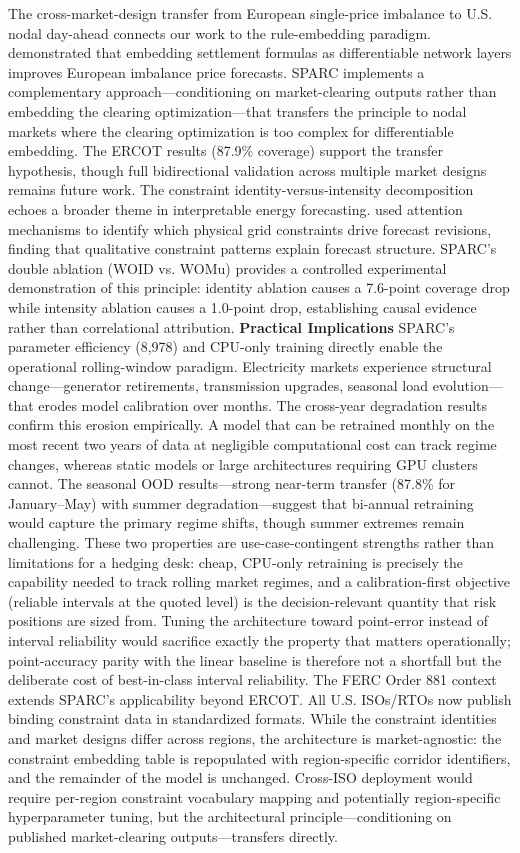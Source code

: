 \documentclass[twoside]{article}
\begin{document}
The cross-market-design transfer from European single-price imbalance to U.S. nodal day-ahead connects our work to the rule-embedding paradigm. \cite{yu2026marketruleinformed} demonstrated that embedding settlement formulas as differentiable network layers improves European imbalance price forecasts. SPARC implements a complementary approach---conditioning on market-clearing outputs rather than embedding the clearing optimization---that transfers the principle to nodal markets where the clearing optimization is too complex for differentiable embedding. The ERCOT results (87.9\% coverage) support the transfer hypothesis, though full bidirectional validation across multiple market designs remains future work.
The constraint identity-versus-intensity decomposition echoes a broader theme in interpretable energy forecasting. \cite{toubeau2021interpretable} used attention mechanisms to identify which physical grid constraints drive forecast revisions, finding that qualitative constraint patterns explain forecast structure. SPARC's double ablation (WOID vs. WOMu) provides a controlled experimental demonstration of this principle: identity ablation causes a 7.6-point coverage drop while intensity ablation causes a 1.0-point drop, establishing causal evidence rather than correlational attribution.
\textbf{Practical Implications}
SPARC's parameter efficiency (8,978) and CPU-only training directly enable the operational rolling-window paradigm. Electricity markets experience structural change---generator retirements, transmission upgrades, seasonal load evolution---that erodes model calibration over months. The cross-year degradation results confirm this erosion empirically. A model that can be retrained monthly on the most recent two years of data at negligible computational cost can track regime changes, whereas static models or large architectures requiring GPU clusters cannot. The seasonal OOD results---strong near-term transfer (87.8\% for January--May) with summer degradation---suggest that bi-annual retraining would capture the primary regime shifts, though summer extremes remain challenging. These two properties are use-case-contingent strengths rather than limitations for a hedging desk: cheap, CPU-only retraining is precisely the capability needed to track rolling market regimes, and a calibration-first objective (reliable intervals at the quoted level) is the decision-relevant quantity that risk positions are sized from. Tuning the architecture toward point-error instead of interval reliability would sacrifice exactly the property that matters operationally; point-accuracy parity with the linear baseline is therefore not a shortfall but the deliberate cost of best-in-class interval reliability.
The FERC Order 881 context extends SPARC's applicability beyond ERCOT. All U.S. ISOs/RTOs now publish binding constraint data in standardized formats. While the constraint identities and market designs differ across regions, the architecture is market-agnostic: the constraint embedding table is repopulated with region-specific corridor identifiers, and the remainder of the model is unchanged. Cross-ISO deployment would require per-region constraint vocabulary mapping and potentially region-specific hyperparameter tuning, but the architectural principle---conditioning on published market-clearing outputs---transfers directly.
\end{document}
